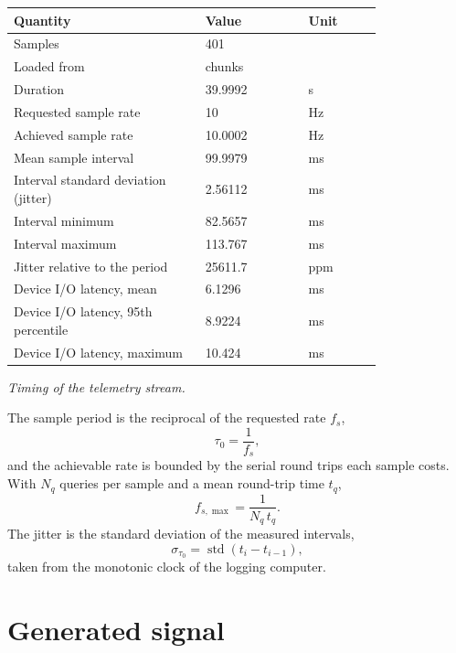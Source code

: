 \documentclass[11pt]{article}
\begin{document}
\begin{center}
\begin{tabular}{@{}p{0.52\linewidth}p{0.28\linewidth}l@{}}
\toprule
\textbf{Quantity} & \textbf{Value} & \textbf{Unit} \\
\midrule
Samples & 401 &  \\
Loaded from & chunks &  \\
Duration & 39.9992 & s \\
Requested sample rate & 10 & Hz \\
Achieved sample rate & 10.0002 & Hz \\
Mean sample interval & 99.9979 & ms \\
Interval standard deviation (jitter) & 2.56112 & ms \\
Interval minimum & 82.5657 & ms \\
Interval maximum & 113.767 & ms \\
Jitter relative to the period & 25611.7 & ppm \\
Device I/O latency, mean & 6.1296 & ms \\
Device I/O latency, 95th percentile & 8.9224 & ms \\
Device I/O latency, maximum & 10.424 & ms \\
\bottomrule
\end{tabular}

\emph{Timing of the telemetry stream.}
\end{center}

The sample period is the reciprocal of the requested rate $f_s$,
\begin{equation}
  \tau_0 = \frac{1}{f_s},
\end{equation}
and the achievable rate is bounded by the serial round trips each sample
costs. With $N_q$ queries per sample and a mean round-trip time $t_q$,
\begin{equation}
  f_{s,\max} = \frac{1}{N_q\,t_q}.
\end{equation}
The jitter is the standard deviation of the measured intervals,
\begin{equation}
  \sigma_{\tau_0} = \operatorname{std}\left(t_i - t_{i-1}\right),
\end{equation}
taken from the monotonic clock of the logging computer.

\section{Generated signal}
\end{document}
